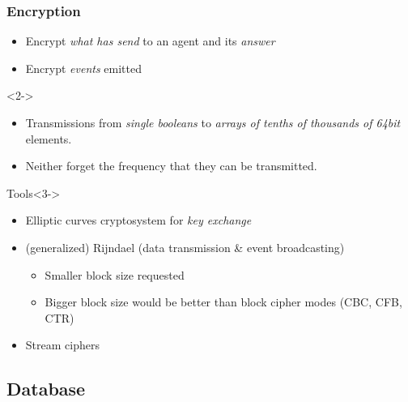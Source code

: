 \documentclass{beamer}
\begin{document}
\begin{frame}
\frametitle{Encryption}
    \begin{itemize}
        \item Encrypt \emph{what has send} to an agent and its \emph{answer}
        \item Encrypt \emph{events} emitted
    \end{itemize}
    \begin{exampleblock}{}<2->
        \begin{itemize}
            \item Transmissions from \emph{single booleans} to \emph{arrays of tenths of thousands of 64bit} elements.
            \item Neither forget the frequency that they can be transmitted.
        \end{itemize}
    \end{exampleblock}
    \begin{alertblock}{Tools}<3->
        \begin{itemize}
            \item Elliptic curves cryptosystem for \emph{key exchange}
            \item<4-> (generalized) Rijndael (data transmission \& event broadcasting)
            \begin{itemize}
                \item<5-|alert@1> Smaller block size requested
                \item<5-|alert@1> Bigger block size would be better than block cipher modes (CBC, CFB, CTR)
            \end{itemize}
            \item<6-> Stream ciphers
        \end{itemize}
    \end{alertblock}
\end{frame}

\subsection{Database}
\end{document}
